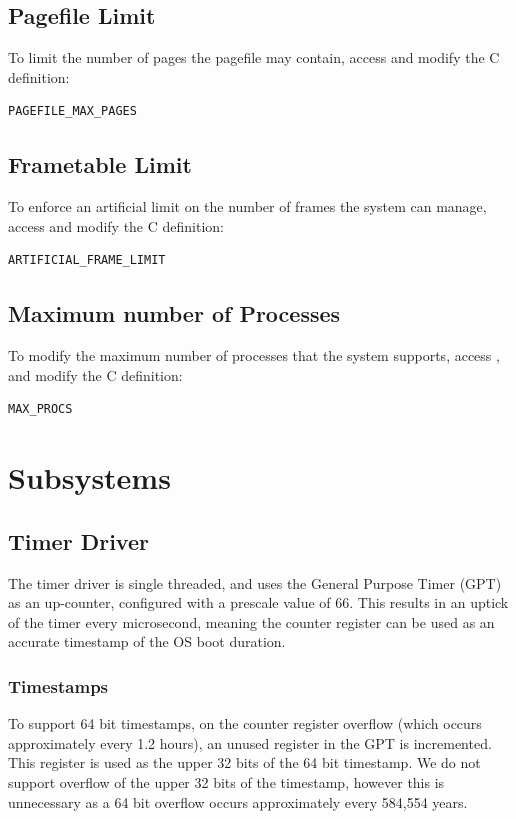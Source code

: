 \documentclass[runningheads,a4paper]{llncs}
\begin{document}
\subsection{Pagefile Limit}
To limit the number of pages the pagefile may contain, access  and modify the C definition:
\begin{verbatim}
PAGEFILE_MAX_PAGES
\end{verbatim}

\subsection{Frametable Limit}
To enforce an artificial limit on the number of frames the system can manage,
access  and modify the C definition:
\begin{verbatim}
ARTIFICIAL_FRAME_LIMIT
\end{verbatim}

\subsection{Maximum number of Processes}
To modify the maximum number of processes that the system supports, access , and modify the C definition:
\begin{verbatim}
MAX_PROCS
\end{verbatim}

\medskip
\medskip

\section{Subsystems}

\subsection{Timer Driver}
The timer driver  is single threaded, and uses the General Purpose Timer (GPT) as an up-counter, configured with a prescale value of 66. This results in an uptick of the timer every microsecond, meaning the counter register can be used as an accurate timestamp of the OS boot duration.

\subsubsection{Timestamps}
To support 64 bit timestamps, on the counter register overflow (which occurs approximately every 1.2 hours), an unused register in the GPT is incremented. This register is used as the upper 32 bits of the 64 bit timestamp. We do not support overflow of the upper 32 bits of the timestamp, however this is unnecessary as a 64 bit overflow occurs approximately every 584,554 years.
\end{document}
